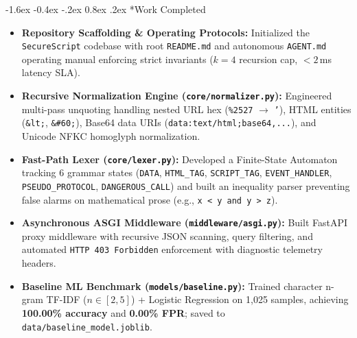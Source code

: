 \documentclass[11pt,a4paper]{article}
\makeatletter
\renewcommand{\section}{\@startsection{section}{1}{\z@}%
  {-1.6ex \@plus -0.4ex \@minus -.2ex}%
  {0.8ex \@plus .2ex}%
  {\normalfont\large\bfseries\color{primaryblue}}}
\makeatother
\begin{document}
\section*{Work Completed}
\begin{itemize}[leftmargin=1.5em, itemsep=1pt]
    \item \textbf{Repository Scaffolding \& Operating Protocols:} Initialized the \texttt{SecureScript} codebase with root \texttt{README.md} and autonomous \texttt{AGENT.md} operating manual enforcing strict invariants ($k=4$ recursion cap, $< 2$\,ms latency SLA).
    \item \textbf{Recursive Normalization Engine (\texttt{core/normalizer.py}):} Engineered multi-pass unquoting handling nested URL hex (\texttt{\%2527} $\rightarrow$ \texttt{'}), HTML entities (\texttt{\&lt;}, \texttt{\&\#60;}), Base64 data URIs (\texttt{data:text/html;base64,...}), and Unicode NFKC homoglyph normalization.
    \item \textbf{Fast-Path Lexer (\texttt{core/lexer.py}):} Developed a Finite-State Automaton tracking 6 grammar states (\texttt{DATA}, \texttt{HTML\_TAG}, \texttt{SCRIPT\_TAG}, \texttt{EVENT\_HANDLER}, \texttt{PSEUDO\_PROTOCOL}, \texttt{DANGEROUS\_CALL}) and built an inequality parser preventing false alarms on mathematical prose (e.g., \texttt{x < y and y > z}).
    \item \textbf{Asynchronous ASGI Middleware (\texttt{middleware/asgi.py}):} Built FastAPI proxy middleware with recursive JSON scanning, query filtering, and automated \texttt{HTTP 403 Forbidden} enforcement with diagnostic telemetry headers.
    \item \textbf{Baseline ML Benchmark (\texttt{models/baseline.py}):} Trained character n-gram TF-IDF ($n \in [2, 5]$) + Logistic Regression on 1,025 samples, achieving \textbf{100.00\% accuracy} and \textbf{0.00\% FPR}; saved to \texttt{data/baseline\_model.joblib}.
\end{itemize}
\end{document}

